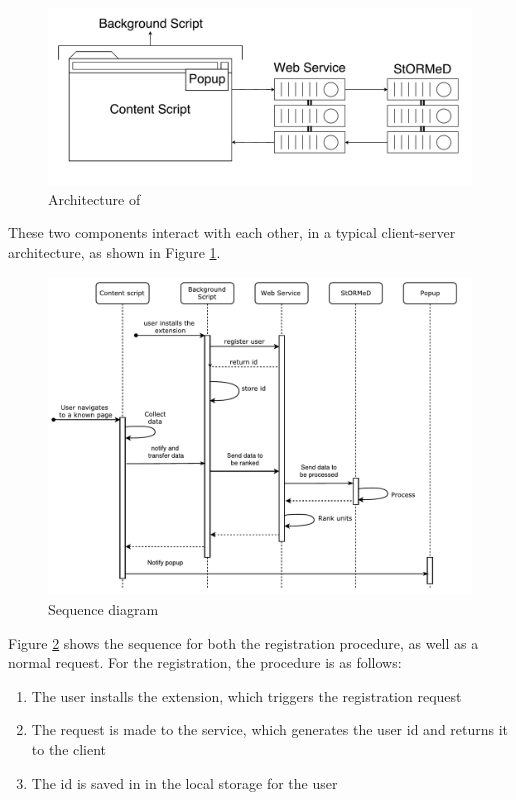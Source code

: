 \begin{figure}[H]
\centering
\includegraphics[scale=0.4]{Figures/ArchitectureNoLabel}
\caption{Architecture of \projectName}
\label{fig:architecture}
\end{figure} 
These two components interact with each other, in a typical client-server architecture, as shown in Figure \ref{fig:architecture}.


\begin{figure}[H]
\centering
\includegraphics[scale=0.75]{Figures/SequenceDiagramAll}
\caption{Sequence diagram}
\label{fig:sequenceDiagram}
\end{figure}


Figure \ref{fig:sequenceDiagram} shows the sequence for both the registration procedure, as well as a normal request. For the registration, the procedure is as follows:
\begin{enumerate}
\item The user installs the extension, which triggers the registration request
\item The request is made to the service, which generates the user id and returns it to the client
\item The id is saved in in the local storage for the user
\end{enumerate}

